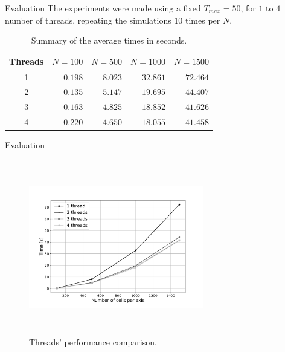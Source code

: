\documentclass{beamer}
\begin{document}
        \begin{frame}{Evaluation}
            The experiments were made using a fixed $T_{max}=50$, for $1$ to $4$ number of threads, repeating the 
            simulations $10$ times per $N$.
            
            \begin{table}[!ht]
                \renewcommand{\arraystretch}{1.3}
                \centering
                \caption{Summary of the average times in seconds.}
                \label{tab:results}
                \begin{tabular}{c||rrrr}
                    \hline
                    Threads & $N=100$ & $N=500$ & $N=1000$ & $N=1500$ \\ \hline\hline
                    1       & $0.198$   & $8.023$   & $32.861$   & $72.464$   \\
                    2       & $0.135$   & $5.147$   & $19.695$   & $44.407$   \\
                    3       & $0.163$   & $4.825$   & $18.852$   & $41.626$   \\
                    4       & $0.220$   & $4.650$   & $18.055$   & $41.458$  
                \end{tabular}
            \end{table}
        \end{frame}
        
        \begin{frame}{Evaluation}
            \begin{figure}[!ht]
                \centering
                \includegraphics[width=3in,height=3in,clip,keepaspectratio]{img/benchmark.pdf}
                \caption{Threads' performance comparison.}
                \label{fig:benchmark}
            \end{figure}
        \end{frame}
        
\end{document}
